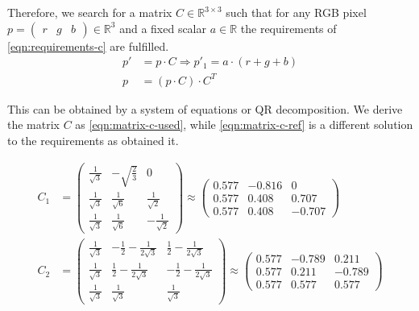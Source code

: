 Therefore, we search for a matrix $C \in \mathbb{R}^{3\times3}$ such that for any RGB pixel $p = \begin{pmatrix}r & g &b\end{pmatrix} \in \mathbb{R}^3$ and a fixed scalar $a \in \mathbb{R}$ the requirements of \autoref{eqn:requirements-c} are fulfilled.
\begin{equation}
   \label{eqn:requirements-c}
   \begin{aligned}
      p' & = p \cdot C \Rightarrow p'_1 = a \cdot (r + g + b) \\
      p  & = (p \cdot C) \cdot C^T
   \end{aligned}
\end{equation}

This can be obtained by a system of equations or QR decomposition. 
We derive the matrix $C$ as \autoref{eqn:matrix-c-used}, while \autoref{eqn:matrix-c-ref} is a different solution to the requirements as \textcite{sbgm} obtained it.

\begin{align}
   C_1 & =
   \begin{pmatrix}
      \frac{1}{\sqrt{3}} & - \sqrt{\frac{2}{3}} & 0                   \\
      \frac{1}{\sqrt{3}} & \frac{1}{\sqrt{6}}   & \frac{1}{\sqrt{2}}  \\
      \frac{1}{\sqrt{3}} & \frac{1}{\sqrt{6}}   & -\frac{1}{\sqrt{2}}
   \end{pmatrix}
   \approx
   \begin{pmatrix}
      0.577 & -0.816 & 0      \\
      0.577 & 0.408  & 0.707  \\
      0.577 & 0.408  & -0.707
   \end{pmatrix}
   \label{eqn:matrix-c-ref} \\
   C_2 & =
   \begin{pmatrix}
      \frac{1}{\sqrt{3}} & -\frac{1}{2} - \frac{1}{2\sqrt{3}} & \frac{1}{2} - \frac{1}{2\sqrt{3}}  \\
      \frac{1}{\sqrt{3}} & \frac{1}{2} - \frac{1}{2\sqrt{3}}  & -\frac{1}{2} - \frac{1}{2\sqrt{3}} \\
      \frac{1}{\sqrt{3}} & \frac{1}{\sqrt{3}}                 & \frac{1}{\sqrt{3}}
   \end{pmatrix}
   \approx
   \begin{pmatrix}
      0.577 & -0.789 & 0.211  \\
      0.577 & 0.211  & -0.789 \\
      0.577 & 0.577  & 0.577
   \end{pmatrix}
   \label{eqn:matrix-c-used}
\end{align}

